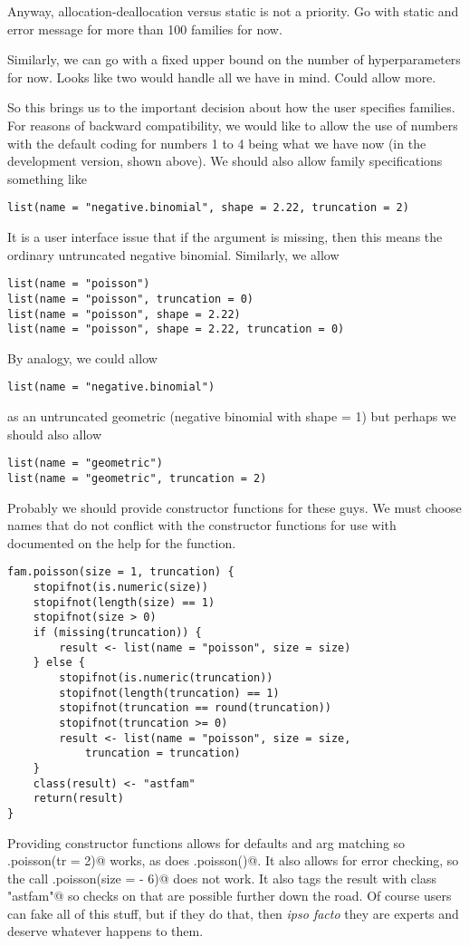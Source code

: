 \documentclass[11pt]{article}
\begin{document}
Anyway, allocation-deallocation versus static is not a priority.
Go with static and error message for more than 100 families for now.

Similarly, we can go with a fixed upper bound on the number of hyperparameters
for now.  Looks like two would handle all we have in mind.  Could allow more.

So this brings us to the important decision about how the user specifies
families.  For reasons of backward compatibility, we would like to allow
the use of numbers with the default coding for numbers 1 to 4 being what
we have now (in the development version, shown above).
We should also allow family specifications something like
\begin{verbatim}
list(name = "negative.binomial", shape = 2.22, truncation = 2)
\end{verbatim}
It is a user interface issue that if the \verb@truncation@ argument
is missing, then this means the ordinary untruncated negative binomial.
Similarly, we allow
\begin{verbatim}
list(name = "poisson")
list(name = "poisson", truncation = 0)
list(name = "poisson", shape = 2.22)
list(name = "poisson", shape = 2.22, truncation = 0)
\end{verbatim}
By analogy, we could allow
\begin{verbatim}
list(name = "negative.binomial")
\end{verbatim}
as an untruncated geometric (negative binomial with shape = 1)
but perhaps we should also allow
\begin{verbatim}
list(name = "geometric")
list(name = "geometric", truncation = 2)
\end{verbatim}

Probably we should provide constructor functions for these guys.
We must choose names that do not conflict with the constructor
functions for use with \verb@glm@ documented on the help for
the \verb@family@ function.
\begin{verbatim}
fam.poisson(size = 1, truncation) {
    stopifnot(is.numeric(size))
    stopifnot(length(size) == 1)
    stopifnot(size > 0)
    if (missing(truncation)) {
        result <- list(name = "poisson", size = size)
    } else {
        stopifnot(is.numeric(truncation))
        stopifnot(length(truncation) == 1)
        stopifnot(truncation == round(truncation))
        stopifnot(truncation >= 0)
        result <- list(name = "poisson", size = size,
            truncation = truncation)
    }
    class(result) <- "astfam"
    return(result)
}
\end{verbatim}
Providing constructor functions
allows for defaults and arg matching
so \verb@fam.poisson(tr = 2)@ works, as does \verb@fam.poisson()@.
It also allows for error checking, so the call
\verb@fam.poisson(size = - 6)@ does
not work.
It also tags the result with class \verb@"astfam"@ so checks on that
are possible further down the road.
Of course users can fake all of this stuff, but if they do that,
then \emph{ipso facto} they are experts and deserve whatever happens
to them.
\end{document}
